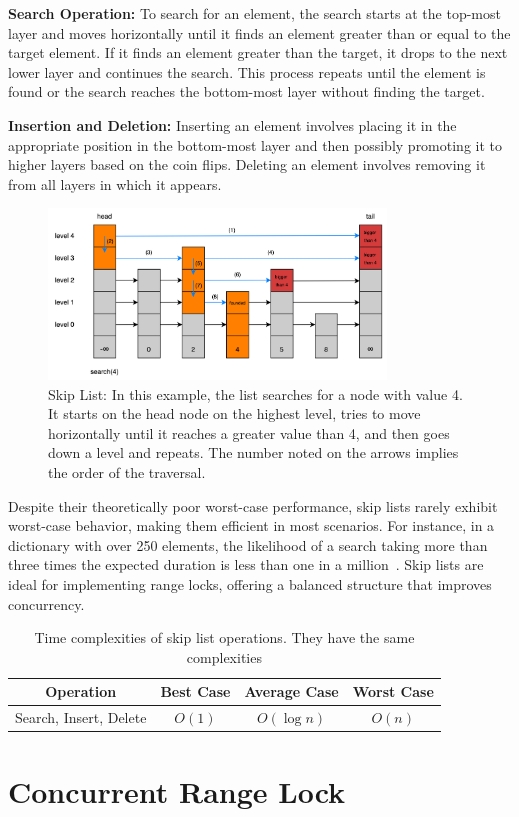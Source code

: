 \textbf{Search Operation:} To search for an element, the search starts at the top-most layer and moves horizontally until it finds an element greater than or equal to the target element. If it finds an element greater than the target, it drops to the next lower layer and continues the search. This process repeats until the element is found or the search reaches the bottom-most layer without finding the target.

\textbf{Insertion and Deletion:} Inserting an element involves placing it in the appropriate position in the bottom-most layer and then possibly promoting it to higher layers based on the coin flips. Deleting an element involves removing it from all layers in which it appears.

\begin{figure}[h]
    \centering
    \includegraphics[width=0.8\textwidth]{./figures/skiplistsearch.jpg}
    \caption{Skip List: In this example, the list searches for a node with value 4. It starts on the head node on the highest level, tries to move horizontally until it reaches a greater value than 4, and then goes down a level and repeats. The number noted on the arrows implies the order of the traversal.}
    \label{fig:skiplistsearch}
\end{figure}

Despite their theoretically poor worst-case performance, skip lists rarely exhibit worst-case behavior, making them efficient in most scenarios. For instance, in a dictionary with over 250 elements, the likelihood of a search taking more than three times the expected duration is less than one in a million~\parencite{pugh1990skip2}. Skip lists are ideal for implementing range locks, offering a balanced structure that improves concurrency.


\begin{table}[h!]
    \centering
    \begin{tabular}{|c|c|c|c|}
        \hline
        \textbf{Operation} & \textbf{Best Case} & \textbf{Average Case} & \textbf{Worst Case} \\ \hline
 Search, Insert, Delete & $O(1)$ & $O(\log n)$ & $O(n)$ \\ \hline
    \end{tabular}
    \caption{Time complexities of skip list operations. They have the same complexities}
    \label{table:skiplisttimecomplexity}
\end{table}

\newpage

\section{Concurrent Range Lock}